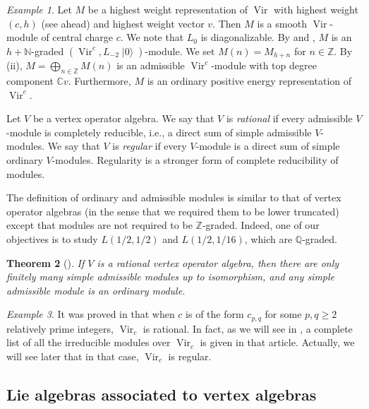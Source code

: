 \documentclass[a4paper, 12pt, reqno]{amsart}
\newtheorem{theorem}{Theorem}[section]
\theoremstyle{remark}
\newtheorem{example}[theorem]{Example}
\DeclareMathOperator{\Vir}{Vir}
\DeclareMathOperator{\vac}{|0\rangle}
\begin{document}
\begin{example}
  \label{exa:11}
  Let $M$ be a highest weight representation of $\Vir$ with highest weight $(c, h)$ (see  ahead) and highest weight vector $v$.
  Then $M$ is a smooth $\Vir$-module of central charge $c$.
  We note that $L_0$ is diagonalizable.
  By  and , $M$ is an $h + \mathbb{N}$-graded $(\Vir^c, L_{-2}\vac)$-module.
  We set $M(n) = M_{h + n}$ for $n \in \mathbb{Z}$.
  By (ii), $M = \bigoplus_{n \in \mathbb{Z}}M(n)$ is an admissible $\Vir^c$-module with top degree component $\mathbb{C}v$.
  Furthermore, $M$ is an ordinary positive energy representation of $\Vir^c$.
\end{example}

Let $V$ be a vertex operator algebra.
We say that $V$ is \emph{rational} if every admissible $V$-module is completely reducible, i.e., a direct sum of simple admissible $V$-modules.
We say that $V$ is \emph{regular} if every $V$-module is a direct sum of simple ordinary $V$-modules.
Regularity is a stronger form of complete reducibility of modules.

The definition of ordinary and admissible modules is similar to that of vertex operator algebras (in the sense that we required them to be lower truncated) except that modules are not required to be $\mathbb{Z}$-graded.
Indeed, one of our objectives is to study $L(1/2, 1/2)$ and $L(1/2, 1/16)$, which are $\mathbb{Q}$-graded.

\begin{theorem}[{\cite{dong_twisted_1998}}]
  \label{thr:28}
  If $V$ is a rational vertex operator algebra, then there are only finitely many simple admissible modules up to isomorphism, and any simple admissible module is an ordinary module.
\end{theorem}

\begin{example}
  \label{exa:12}
  It was proved in \cite{wang_rationality_1993} that when $c$ is of the form $c_{p, q}$ for some $p, q \ge 2$ relatively prime integers, $\Vir_c$ is rational.
  In fact, as we will see in , a complete list of all the irreducible modules over $\Vir_c$ is given in that article.
  Actually, we will see later that in that case, $\Vir_c$ is regular.
\end{example}

\subsection{Lie algebras associated to vertex algebras}
\label{sec:lie-algebr-assoc}
\end{document}
